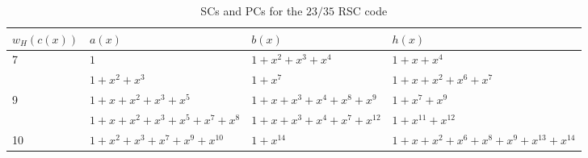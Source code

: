 	
	\begin{table}[htbp]
		\caption{SCs and PCs for the $23/35$ RSC code}
		\centering
		\begin{tabularx}{0.75\textwidth}{lXlX} 
			\toprule
			$w_H(c(x))$ & $a(x)$ & $b(x)$ & $h(x)$ \\ [0.5ex] 
			\midrule
			7&$1$ & $1+x^2+x^3+x^4$ & $1+x+x^{4}$\\
			\hline
			&$1+x^2+x^3$ & $1+x^7$ & $1+x+x^2+x^6+x^7$\\
			\hline 
			9&$1+x+x^2+x^3+x^5$ & $1+x+x^3+x^4+x^8+x^9$ & $1+x^7+x^9$\\
			\hline
			&$1+x+x^2+x^3+x^5+x^7+x^8$ & $1+x+x^3+x^4+x^7+x^{12}$ & $1+x^{11}+x^{12}$\\
			\hline
			10&$1+x^2+x^3+x^7+x^9+x^{10}$ & $1+x^{14}$ & $1+x+x^2+x^6+x^8+x^9+x^{13}+x^{14}$\\
			\bottomrule
		\end{tabularx}
		
		\label{novelTab15}
	\end{table}